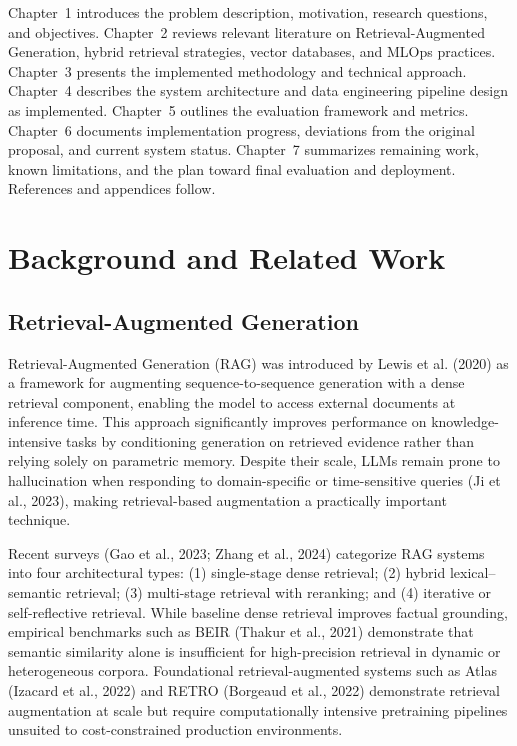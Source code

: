 \documentclass[12pt,a4paper]{report}
\begin{document}
Chapter~1 introduces the problem description, motivation, research questions, and objectives. Chapter~2 reviews relevant literature on Retrieval-Augmented Generation, hybrid retrieval strategies, vector databases, and MLOps practices. Chapter~3 presents the implemented methodology and technical approach. Chapter~4 describes the system architecture and data engineering pipeline design as implemented. Chapter~5 outlines the evaluation framework and metrics. Chapter~6 documents implementation progress, deviations from the original proposal, and current system status. Chapter~7 summarizes remaining work, known limitations, and the plan toward final evaluation and deployment. References and appendices follow.

\chapter{Background and Related Work}

\section{Retrieval-Augmented Generation}
\label{sec:lit_rag}

Retrieval-Augmented Generation (RAG) was introduced by Lewis et al. (2020) as a framework for augmenting sequence-to-sequence generation with a dense retrieval component, enabling the model to access external documents at inference time. This approach significantly improves performance on knowledge-intensive tasks by conditioning generation on retrieved evidence rather than relying solely on parametric memory. Despite their scale, LLMs remain prone to hallucination when responding to domain-specific or time-sensitive queries (Ji et al., 2023), making retrieval-based augmentation a practically important technique.

Recent surveys (Gao et al., 2023; Zhang et al., 2024) categorize RAG systems into four architectural types: (1) single-stage dense retrieval; (2) hybrid lexical--semantic retrieval; (3) multi-stage retrieval with reranking; and (4) iterative or self-reflective retrieval. While baseline dense retrieval improves factual grounding, empirical benchmarks such as BEIR (Thakur et al., 2021) demonstrate that semantic similarity alone is insufficient for high-precision retrieval in dynamic or heterogeneous corpora. Foundational retrieval-augmented systems such as Atlas (Izacard et al., 2022) and RETRO (Borgeaud et al., 2022) demonstrate retrieval augmentation at scale but require computationally intensive pretraining pipelines unsuited to cost-constrained production environments.
\end{document}
